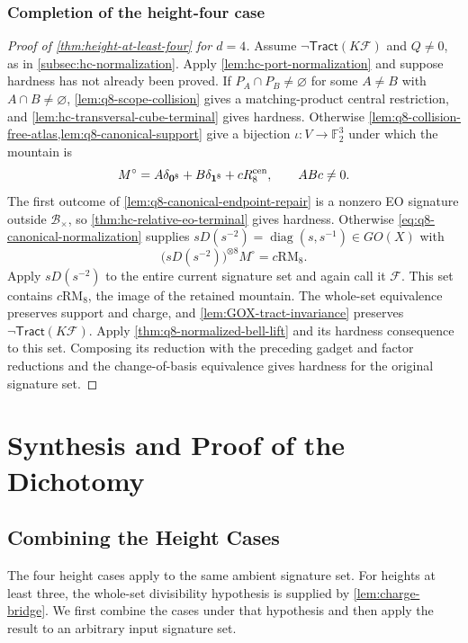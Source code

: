 \documentclass[11pt,letterpaper,onecolumn]{article}
\theoremstyle{plain}
\theoremstyle{definition}
\theoremstyle{remark}
\newcommand{\Ftwo}{\mathbb F_2}
\newcommand{\cF}{\mathcal F}
\newcommand{\Tract}{\mathsf{Tract}}
\newcommand{\diag}{\operatorname{diag}}
\newcommand{\one}{\mathbf 1}
\newcommand{\zero}{\mathbf 0}
\newcommand{\RMcore}{\mathrm{RM}_8}
\begin{document}
\subsubsection{Completion of the height-four case}

	\begin{proof}[Proof of \cref{thm:height-at-least-four} for \(d=4\)]
		Assume \(\neg\Tract(K\cF)\) and \(Q\ne0\), as in
		\cref{subsec:hc-normalization}.
		Apply \cref{lem:hc-port-normalization} and suppose hardness has not
		already been proved.  If \(P_A\cap P_B\ne\varnothing\) for some
		\(A\ne B\) with \(A\cap B\ne\varnothing\), \cref{lem:q8-scope-collision} gives a matching-product central
		restriction, and \cref{lem:hc-transversal-cube-terminal} gives hardness.  Otherwise
		\cref{lem:q8-collision-free-atlas,lem:q8-canonical-support} give a
		bijection \(\iota:V\to\Ftwo^3\) under which the mountain is
		\[
		M^\circ=A\delta_{\zero^8}+B\delta_{\one^8}+cR_8^{\rm cen},
		\qquad ABc\ne0.
		\]
		The first outcome of \cref{lem:q8-canonical-endpoint-repair} is a nonzero EO signature outside \(\mathcal B_\times\), so
		\cref{thm:hc-relative-eo-terminal} gives hardness.
		Otherwise \eqref{eq:q8-canonical-normalization} supplies
		\(sD(s^{-2})=\diag(s,s^{-1})\in GO(X)\) with
		\[
		\bigl(sD(s^{-2})\bigr)^{\otimes8}M^\circ=c\RMcore.
		\]
		Apply \(sD(s^{-2})\) to the entire current signature set and again call it
		\(\cF\). This set contains \(c\RMcore\), the image of the retained
		mountain. The whole-set equivalence preserves support and charge, and
		\cref{lem:GOX-tract-invariance} preserves \(\neg\Tract(K\cF)\).
		Apply \cref{thm:q8-normalized-bell-lift} and its hardness consequence to
		this set. Composing its reduction with the preceding gadget and factor
		reductions and the change-of-basis equivalence gives hardness for the
		original signature set.
	\end{proof}
	
	\section{Synthesis and Proof of the Dichotomy}
	\label{sec:synthesis}
	
	\subsection{Combining the Height Cases}
	\label{sec:mountain-synthesis}
	
	The four height cases apply to the same ambient signature set.  For
heights at least three, the whole-set divisibility hypothesis is supplied
by \cref{lem:charge-bridge}.  We first combine the cases under that
hypothesis and then apply the result to an arbitrary input signature set.
	
\end{document}
